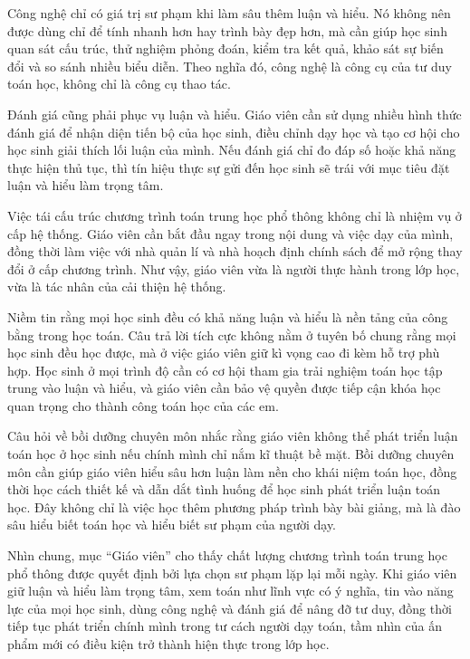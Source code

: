 {{    Công nghệ chỉ có giá trị sư phạm khi làm sâu thêm luận và hiểu. Nó không nên được dùng chỉ để tính nhanh hơn hay trình bày đẹp hơn, mà cần giúp học sinh quan sát cấu trúc, thử nghiệm phỏng đoán, kiểm tra kết quả, khảo sát sự biến đổi và so sánh nhiều biểu diễn. Theo nghĩa đó, công nghệ là công cụ của tư duy toán học, không chỉ là công cụ thao tác.

    Đánh giá cũng phải phục vụ luận và hiểu. Giáo viên cần sử dụng nhiều hình thức đánh giá để nhận diện tiến bộ của học sinh, điều chỉnh dạy học và tạo cơ hội cho học sinh giải thích lối luận của mình. Nếu đánh giá chỉ đo đáp số hoặc khả năng thực hiện thủ tục, thì tín hiệu thực sự gửi đến học sinh sẽ trái với mục tiêu đặt luận và hiểu làm trọng tâm.

    Việc tái cấu trúc chương trình toán trung học phổ thông không chỉ là nhiệm vụ ở cấp hệ thống. Giáo viên cần bắt đầu ngay trong nội dung và việc dạy của mình, đồng thời làm việc với nhà quản lí và nhà hoạch định chính sách để mở rộng thay đổi ở cấp chương trình. Như vậy, giáo viên vừa là người thực hành trong lớp học, vừa là tác nhân của cải thiện hệ thống.

    Niềm tin rằng mọi học sinh đều có khả năng luận và hiểu là nền tảng của công bằng trong học toán. Câu trả lời tích cực không nằm ở tuyên bố chung rằng mọi học sinh đều học được, mà ở việc giáo viên giữ kì vọng cao đi kèm hỗ trợ phù hợp. Học sinh ở mọi trình độ cần có cơ hội tham gia trải nghiệm toán học tập trung vào luận và hiểu, và giáo viên cần bảo vệ quyền được tiếp cận khóa học quan trọng cho thành công toán học của các em.

    Câu hỏi về bồi dưỡng chuyên môn nhắc rằng giáo viên không thể phát triển luận toán học ở học sinh nếu chính mình chỉ nắm kĩ thuật bề mặt. Bồi dưỡng chuyên môn cần giúp giáo viên hiểu sâu hơn luận làm nền cho khái niệm toán học, đồng thời học cách thiết kế và dẫn dắt tình huống để học sinh phát triển luận toán học. Đây không chỉ là việc học thêm phương pháp trình bày bài giảng, mà là đào sâu hiểu biết toán học và hiểu biết sư phạm của người dạy.

    Nhìn chung, mục ``Giáo viên'' cho thấy chất lượng chương trình toán trung học phổ thông được quyết định bởi lựa chọn sư phạm lặp lại mỗi ngày. Khi giáo viên giữ luận và hiểu làm trọng tâm, xem toán như lĩnh vực có ý nghĩa, tin vào năng lực của mọi học sinh, dùng công nghệ và đánh giá để nâng đỡ tư duy, đồng thời tiếp tục phát triển chính mình trong tư cách người dạy toán, tầm nhìn của ấn phẩm mới có điều kiện trở thành hiện thực trong lớp học.}
  }

